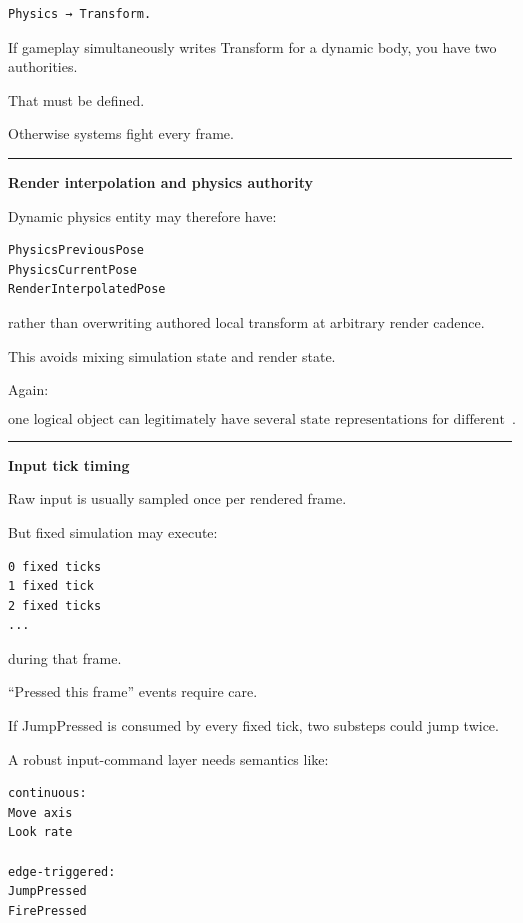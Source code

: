 \begin{verbatim}
Physics → Transform.
\end{verbatim}

If gameplay simultaneously writes Transform for a dynamic body, you have two authorities.

That must be defined.

Otherwise systems fight every frame.

\begin{center}\rule{0.5\linewidth}{0.5pt}\end{center}

\textbf{Render interpolation and physics authority}

Dynamic physics entity may therefore have:

\begin{verbatim}
PhysicsPreviousPose
PhysicsCurrentPose
RenderInterpolatedPose
\end{verbatim}

rather than overwriting authored local transform at arbitrary render cadence.

This avoids mixing simulation state and render state.

Again:

\[
\boxed{
\text{one logical object can legitimately have several state representations for different domains}.
}
\]

\begin{center}\rule{0.5\linewidth}{0.5pt}\end{center}

\textbf{Input tick timing}

Raw input is usually sampled once per rendered frame.

But fixed simulation may execute:

\begin{verbatim}
0 fixed ticks
1 fixed tick
2 fixed ticks
...
\end{verbatim}

during that frame.

``Pressed this frame'' events require care.

If JumpPressed is consumed by every fixed tick, two substeps could jump twice.

A robust input-command layer needs semantics like:

\begin{verbatim}
continuous:
Move axis
Look rate

edge-triggered:
JumpPressed
FirePressed
\end{verbatim}

